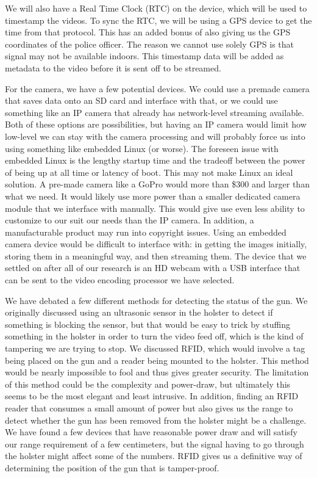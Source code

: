 \documentclass[12pt]{article}
\begin{document}
We will also have a Real Time Clock (RTC) on the device, which will be used to
timestamp the videos. To sync the RTC, we will be using a GPS device to get the
time from that protocol. This has an added bonus of also giving us the GPS
coordinates of the police officer. The reason we cannot use solely GPS is that
signal may not be available indoors. This timestamp data will be added as
metadata to the video before it is sent off to be streamed. 

For the camera, we have a few potential devices. We could use a premade camera
that saves data onto an SD card and interface with that, or we could use
something like an IP camera that already has network-level streaming available.
Both of these options are possibilities, but having an IP camera would limit
how low-level we can stay with the camera processing and will probably force us
into using something like embedded Linux (or worse). The foreseen issue with
embedded Linux is the lengthy startup time and the tradeoff between the power
of being up at all time or latency of boot. This may not make Linux an ideal
solution. A pre-made camera like a GoPro would more than \$300 and larger than
what we need. It would likely use more power than a smaller dedicated camera
module that we interface with manually. This would give use even less ability
to customize to our suit our needs than the IP camera. In addition, a
manufacturable product may run into copyright issues. Using an embedded camera
device would be difficult to interface with: in getting the images initially,
storing them in a meaningful way, and then streaming them. The device that we
settled on after all of our research is an HD webcam with a USB interface that
can be sent to the video encoding processor we have selected.

We have debated a few different methods for detecting the status of the gun. We
originally discussed using an ultrasonic sensor in the holster to detect if
something is blocking the sensor, but that would be easy to trick by stuffing
something in the holster in order to turn the video feed off, which is the kind
of tampering we are trying to stop. We discussed RFID, which would involve a
tag being placed on the gun and a reader being mounted to the holster. This
method would be nearly impossible to fool and thus gives greater security. The
limitation of this method could be the complexity and power-draw, but
ultimately this seems to be the most elegant and least intrusive. In addition,
finding an RFID reader that consumes a small amount of power but also gives us
the range to detect whether the gun has been removed from the holster might be
a challenge. We have found a few devices that have reasonable power draw and
will satisfy our range requirement of a few centimeters, but the signal having
to go through the holster might affect some of the numbers. RFID gives us a
definitive way of determining the position of the gun that is tamper-proof.
\end{document}
